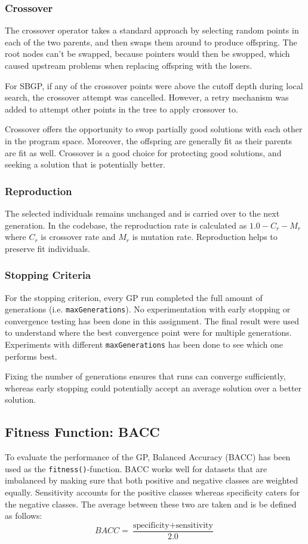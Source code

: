 \documentclass{article}
\begin{document}
\subsubsection{Crossover}
The crossover operator takes a standard approach by selecting random points in each of the two parents, and then swaps them around to produce offspring. The root nodes can't be swapped, because pointers would then be swopped, which caused upstream problems when replacing offspring with the losers.

For SBGP, if any of the crossover points were above the cutoff depth during local search, the crossover attempt was cancelled. However, a retry mechanism was added to attempt other points in the tree to apply crossover to.

Crossover offers the opportunity to swop partially good solutions with each other in the program space. Moreover, the offspring are generally fit as their parents are fit as well. Crossover is a good choice for protecting good solutions, and seeking a solution that is potentially better.

\subsubsection{Reproduction}
The selected individuals remains unchanged and is carried over to the next generation. In the codebase, the reproduction rate is calculated as \(1.0-C_r-M_r\) where \(C_r\) is crossover rate and \(M_r\) is mutation rate. Reproduction helps to preserve fit individuals.

\subsubsection{Stopping Criteria}
For the stopping criterion, every GP run completed the full amount of generations (i.e. \texttt{maxGenerations}). No experimentation with early stopping or convergence testing has been done in this assignment. The final result were used to understand where the best convergence point were for multiple generations. Experiments with different \texttt{maxGenerations} has been done to see which one performs best.

Fixing the number of generations ensures that runs can converge sufficiently, whereas early stopping could potentially accept an average solution over a better solution.

\subsection{Fitness Function: BACC}
\label{fitness}
To evaluate the performance of the GP, Balanced Accuracy (BACC) has been used as the \texttt{fitness()}-function. BACC works well for datasets that are imbalanced by making sure that both positive and negative classes are weighted equally. Sensitivity accounts for the positive classes whereas specificity caters for the negative classes. The average between these two are taken and is be defined as follows:
\begin{equation}\label{BACC}
  BACC = \frac{\text{specificity} + \text{sensitivity}}{2.0}
\end{equation}
\end{document}
